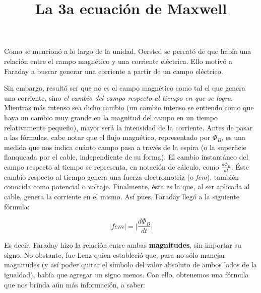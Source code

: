 \documentclass{article}
\begin{document}
\title{La 3a ecuación de Maxwell}
\date{}
\maketitle



Como se mencionó a lo largo de la unidad, Oersted se percató de que había una relación entre el campo magnético y una corriente eléctrica. Ello motivó a Faraday a buscar generar una corriente a partir de un campo eléctrico.\bigskip

Sin embargo, resultó ser que no es el campo magnético como tal el que genera una corriente, sino \emph{el cambio del campo respecto al tiempo en que se logra}. Mientras más intenso sea dicho cambio (un cambio intenso se entiendo como que haya un cambio muy grande en la magnitud del campo en un tiempo relativamente pequeño), mayor será la intensidad de la corriente. Antes de pasar a las fórmulas, cabe notar que el flujo magnético, representado por $\Phi_B$, es una medida que nos indica cuánto campo pasa a través de la espira (o la superficie flanqueada por el cable, independiente de su forma). El cambio instantáneo del campo respecto al tiempo se representa, en notación de cálculo, como $\frac{d\Phi_B}{dt}$. Éste cambio respecto al tiempo genera una fuerza electromotriz (o \emph{fem}), también conocida como potencial o voltaje. Finalmente, ésta es la que, al ser aplicada al cable, genera la corriente en el mismo. Así pues, Faraday llegó a la siguiente fórmula:\bigskip

\begin{equation}
|fem|=\Bigg|\frac{d\Phi_B}{dt}\Bigg|
\end{equation}\bigskip

Es decir, Faraday hizo la relación entre ambas \textbf{magnitudes}, sin importar su signo. No obstante, fue Lenz quien estableció que, para no sólo manejar magnitudes (y así poder quitar el símbolo del valor absoluto de ambos lados de la igualdad), había que agregar un signo menos. Con ello, obtenemos una fórmula que nos brinda aún más información, a saber:\bigskip
\end{document}
